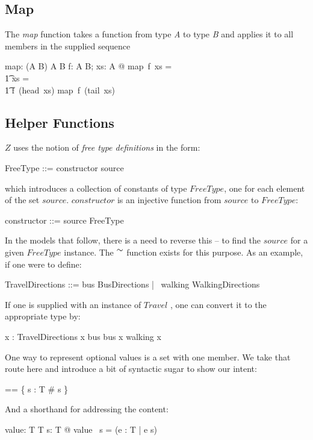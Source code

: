 \documentclass[fuzz]{llncs}
\def\zc{\textit}
\begin{document}
\subsection{Map}
The \zc{map} function takes a function from type \zc{A} to type \zc{B} and applies it to
all members in the supplied sequence
\begin{gendef}[A,B]
   map: (A \fun B) \fun \seq A \fun \seq B
\where
   \forall f: A \fun B; xs: \seq A @ map~f~xs = \\
\t1 \IF xs = \langle \rangle \THEN \langle \rangle \\
\t1 \ELSE \langle f~(head~xs) \rangle \cat map~f~(tail~xs)
\end{gendef}

\subsection{Helper Functions}
${Z}$ uses the notion of \textit{free type definitions} in the form: 
\begin{syntax}
FreeType ::= constructor \ldata source \rdata
\end{syntax}
which introduces a collection of constants of type $FreeType$, one for each element of the set $source$.  $constructor$ is an injective function from $source$ to $FreeType$:
\begin{syntax}
constructor ::= source \inj FreeType
\end{syntax}
In the models that follow, there is a need to reverse this -- to find the $source$ for a given $FreeType$ instance. The 
$\inv$ function exists for this purpose.  As an example, if one were to define:
\begin{syntax}
TravelDirections ::= bus \ldata BusDirections \rdata | \ walking \ldata WalkingDirections \rdata
\end{syntax}
If one is supplied with an instance of $Travel$ , one can convert it to the appropriate type by:
\begin{syntax}
x : TravelDirections
\where
\IF x \in \ran bus \THEN bus \inv x \ELSE walking \inv x
\end{syntax}


One way to represent optional values is a set with one member.  We take that route here 
and introduce a bit of syntactic sugar to show our intent:
\begin{zed} 
  \optional[T] == \{ s : \power T \mid \# s  \} \\
\end{zed}

And a shorthand for addressing the content:
\begin{gendef}[T]
   value: \power T \pfun T
\where
   \forall s: \power T @ value~ s = (\mu e : T | e \in s) 
\end{gendef}



\end{document}
